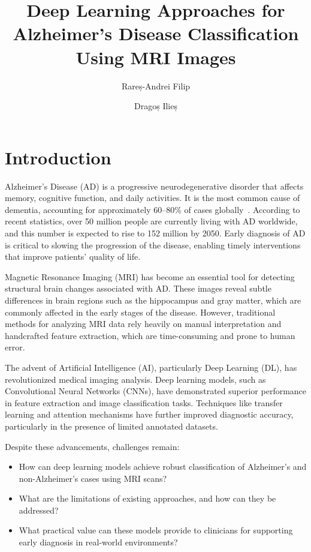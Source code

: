 \documentclass[runningheads]{llncs}
\title{Deep Learning Approaches for Alzheimer’s Disease Classification Using MRI Images}
\author{Rareș-Andrei Filip\inst{1} \and Dragoș Ilieș\inst{1}}
\institute{
Faculty of Economics and Business Administration (FSEGA), \\
Babeș-Bolyai University (UBB), Cluj-Napoca, Romania
}
\begin{document}
\maketitle
\pagestyle{plain}

\begin{abstract}
\end{abstract}


\section{Introduction}

Alzheimer's Disease (AD) is a progressive neurodegenerative disorder that affects memory, cognitive function, and daily activities. It is the most common cause of dementia, accounting for approximately 60–80\% of cases globally~\cite{helaly2021}. According to recent statistics, over 50 million people are currently living with AD worldwide, and this number is expected to rise to 152 million by 2050. Early diagnosis of AD is critical to slowing the progression of the disease, enabling timely interventions that improve patients' quality of life.

Magnetic Resonance Imaging (MRI) has become an essential tool for detecting structural brain changes associated with AD. These images reveal subtle differences in brain regions such as the hippocampus and gray matter, which are commonly affected in the early stages of the disease. However, traditional methods for analyzing MRI data rely heavily on manual interpretation and handcrafted feature extraction, which are time-consuming and prone to human error.

The advent of Artificial Intelligence (AI), particularly Deep Learning (DL), has revolutionized medical imaging analysis. Deep learning models, such as Convolutional Neural Networks (CNNs), have demonstrated superior performance in feature extraction and image classification tasks. Techniques like transfer learning and attention mechanisms have further improved diagnostic accuracy, particularly in the presence of limited annotated datasets.

Despite these advancements, challenges remain:
\begin{itemize}
    \item How can deep learning models achieve robust classification of Alzheimer's and non-Alzheimer's cases using MRI scans?
    \item What are the limitations of existing approaches, and how can they be addressed?
    \item What practical value can these models provide to clinicians for supporting early diagnosis in real-world environments?
\end{itemize}
\end{document}
